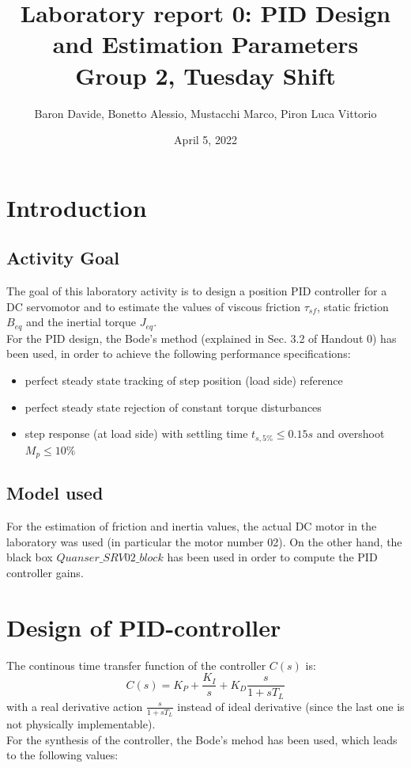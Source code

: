 \documentclass[11pt]{article}
\title{
	{\Large Laboratory report 0: PID Design and Estimation Parameters \\
	 \large Group 2, Tuesday Shift}
}
\author{Baron Davide, Bonetto Alessio, Mustacchi Marco, Piron Luca Vittorio}
\date{April 5, 2022}
\begin{document}
\maketitle

\section{Introduction}

	\subsection{Activity Goal}
	The goal of this laboratory activity is to design a position PID controller for a DC servomotor and to estimate the values
	of viscous friction $\tau_{sf}$, static friction $B_{eq}$ and the inertial torque $J_{eq}$. \\
	For the PID design, the Bode's method (explained in Sec. 3.2 of Handout 0) has been used, in order to achieve the following performance specifications:
	
	\begin{itemize}
		\item perfect steady state tracking of step position (load side) reference
		\item perfect steady state rejection of constant torque disturbances
		\item step response (at load side) with settling time $t_{s,5\%} \le 0.15s$ and overshoot $M_{p} \le 10\%$
	\end{itemize}

	\subsection{Model used}
	For the estimation of friction and inertia values, the actual DC motor in the laboratory was used (in particular the motor number 02).
	On the other hand, the black box $\textit{Quanser\_SRV02\_block}$ has been used in order to compute the PID controller gains.

\section{Design of PID-controller}
The continous time transfer function of the controller $C(s)$ is:
	\begin{equation}
		C(s) = K_P +\frac{K_I}{s} + K_D\frac{s}{1 + sT_L}
	\end{equation}
with a real derivative action $\frac{s}{1 + sT_L}$ instead of ideal derivative (since the last one is not physically implementable). \\
For the synthesis of the controller, the Bode's mehod has been used, which leads to the following values:
\end{document}
